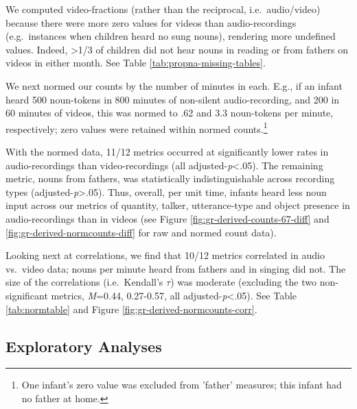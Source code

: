 \documentclass[man]{apa6}
\theoremstyle{definition}
\theoremstyle{definition}
\theoremstyle{definition}
\theoremstyle{remark}
\begin{document}
We computed video-fractions (rather than the reciprocal,
i.e.~audio/video) because there were more zero values for videos than
audio-recordings (e.g.~instances when children heard no sung nouns),
rendering more undefined values. Indeed, \textgreater{}1/3 of children
did not hear nouns in reading or from fathers on videos in either month.
See Table \ref{tab:propna-missing-tables}.

We next normed our counts by the number of minutes in each. E.g., if an
infant heard 500 noun-tokens in 800 minutes of non-silent
audio-recording, and 200 in 60 minutes of videos, this was normed to .62
and 3.3 noun-tokens per minute, respectively; zero values were retained
within normed
counts.\footnote{One infant's zero value was excluded from 'father' measures; this infant had no father at home.}

With the normed data, 11/12 metrics occurred at significantly lower
rates in audio-recordings than video-recordings (all
adjusted-\emph{p}\textless{}.05). The remaining metric, nouns from
fathers, was statistically indistinguishable across recording types
(adjusted-\emph{p}\textgreater{}.05). Thus, overall, per unit time,
infants heard less noun input across our metrics of quantity, talker,
utterance-type and object presence in audio-recordings than in videos
(see Figure \ref{fig:gr-derived-counts-67-diff} and
\ref{fig:gr-derived-normcounts-diff} for raw and normed count data).

Looking next at correlations, we find that 10/12 metrics correlated in
audio vs.~video data; nouns per minute heard from fathers and in singing
did not. The size of the correlations (i.e.~Kendall's \(\tau\)) was
moderate (excluding the two non-significant metrics, \emph{M}=0.44,
0.27-0.57, all adjusted-\emph{p}\textless{}.05). See Table
\ref{tab:normtable} and Figure \ref{fig:gr-derived-normcounts-corr}.

\subsection{Exploratory Analyses}\label{exploratory-analyses}
\end{document}

